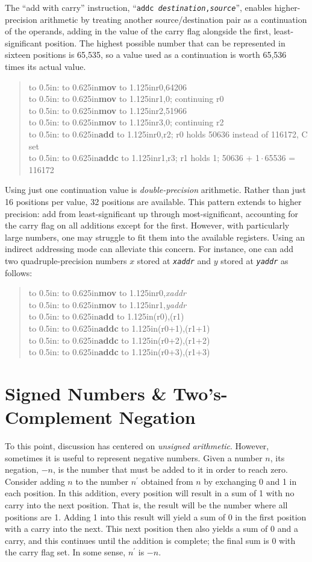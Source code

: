 \documentclass[12pt,english]{book}
\newcommand*{\asmstyle}{\noindent\ttfamily\selectfont\small}
\newcommand*{\asmline}[3][]{%
\null\hbox to 0.5in{\ifx#1\empty\else{#1}:\fi\hss}%
\hbox to 0.625in{\textbf{#2}\hss}%
\hbox to 1.125in{#3\hss}}
\newcommand*{\concept}[2][]{%
  \textit{#2}\ifx#1\empty\empty\index{#2}\else\index{#1}\fi}
\begin{document}
The ``add with carry'' instruction,
``\texttt{addc \textit{destination},\textit{source}}'',
enables higher-precision arithmetic
by treating another source/destination pair
as a continuation of the operands,
adding in the value of the carry flag alongside the first,
least-significant position.
The highest possible number that can be represented in sixteen positions
is 65,535,
so a value used as a continuation is worth 65,536 times
its actual value.

\begin{quote}\asmstyle
\asmline{mov}{r0,64206}\\
\asmline{mov}{r1,0}; continuing r0\\
\asmline{mov}{r2,51966}\\
\asmline{mov}{r3,0}; continuing r2\\
\asmline{add}{r0,r2}; r0 holds 50636 instead of 116172, C set\\
\asmline{addc}{r1,r3}; r1 holds 1; 50636 + 1\({}\cdot{}\)65536 = 116172
\end{quote}

Using just one continuation value
is \concept{double-precision} arithmetic.
Rather than just 16 positions per value,
32 positions are available.
This pattern extends to higher precision:
add from least-significant up through most-significant,
accounting for the carry flag on all additions except for the first.
However, with particularly large numbers,
one may struggle to fit them into the available registers.
Using an indirect addressing mode can alleviate this concern.
For instance, one can add two quadruple-precision numbers
\(x\) stored at \texttt{\textit{xaddr}} and
\(y\) stored at \texttt{\textit{yaddr}} as follows:

\begin{quote}\asmstyle
\asmline{mov}{r0,\textit{xaddr}}\\
\asmline{mov}{r1,\textit{yaddr}}\\
\asmline{add}{(r0),(r1)}\\
\asmline{addc}{(r0+1),(r1+1)}\\
\asmline{addc}{(r0+2),(r1+2)}\\
\asmline{addc}{(r0+3),(r1+3)}
\end{quote}

\section{Signed Numbers \& Two's-Complement Negation}
To this point, discussion has centered on \concept{unsigned arithmetic}.
However, sometimes it is useful to represent negative numbers.
Given a number \(n\), its negation, \(-n\),
is the number that must be added to it in order to reach zero.
Consider adding \(n\)
to the number \(n^{\prime}\) obtained from \(n\)
by exchanging 0 and 1 in each position.
In this addition,
every position will result in a sum of 1
with no carry into the next position.
That is, the result will be the number where all positions are 1.
Adding 1 into this result will yield a sum of 0 in the first position
with a carry into the next.
This next position then also yields a sum of 0 and a carry,
and this continues until the addition is complete;
the final sum is 0 with the carry flag set.
In some sense, \(n^{\prime}\) is \(-n\).
\end{document}

